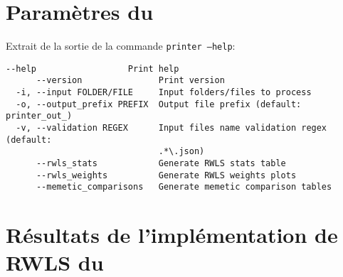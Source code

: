 \documentclass[a4paper,11pt,twoside,french,report]{../common/simplem}
\begin{document}
		\newpage\section{Paramètres du \printer{}}\label{sec:printer_parameters}
			Extrait de la sortie de la commande \texttt{printer --help}:
			\begin{Verbatim}[frame=single]
      --help                  Print help
      --version               Print version
  -i, --input FOLDER/FILE     Input folders/files to process
  -o, --output_prefix PREFIX  Output file prefix (default: printer_out_)
  -v, --validation REGEX      Input files name validation regex (default:
                              .*\.json)
      --rwls_stats            Generate RWLS stats table
      --rwls_weights          Generate RWLS weights plots
      --memetic_comparisons   Generate memetic comparison tables
			\end{Verbatim}
		\newpage\section{Résultats de l'implémentation de \acrshort{RWLS} du \solver{}}\label{sec:result_rwls_solver}
			
	\makeutbmbackcover{}
\end{document}
